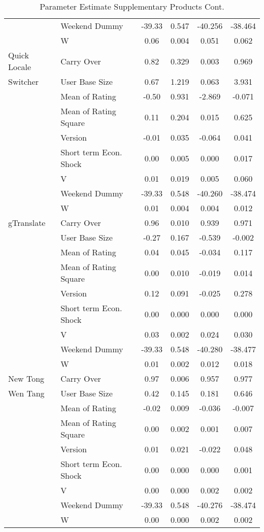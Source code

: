 \documentclass[mksc,nonblindrev]{informs3}
\begin{document}
\begin{table}
\begin{tabular}{llcccc}
	&	Weekend Dummy	&	-39.33	&	0.547	&	-40.256	&	-38.464	\\
	&	W	&	0.06	&	0.004	&	0.051	&	0.062	\\
Quick Locale 	&	Carry Over	&	0.82	&	0.329	&	0.003	&	0.969	\\
Switcher	&	User Base Size	&	0.67	&	1.219	&	0.063	&	3.931	\\
	&	Mean of Rating	&	-0.50	&	0.931	&	-2.869	&	-0.071	\\
	&	Mean of Rating Square	&	0.11	&	0.204	&	0.015	&	0.625	\\
	&	Version	&	-0.01	&	0.035	&	-0.064	&	0.041	\\
	&	Short term Econ. Shock	&	0.00	&	0.005	&	0.000	&	0.017	\\
	&	V	&	0.01	&	0.019	&	0.005	&	0.060	\\
	&	Weekend Dummy	&	-39.33	&	0.548	&	-40.260	&	-38.474	\\
	&	W	&	0.01	&	0.004	&	0.004	&	0.012	\\
gTranslate	&	Carry Over	&	0.96	&	0.010	&	0.939	&	0.971	\\
	&	User Base Size	&	-0.27	&	0.167	&	-0.539	&	-0.002	\\
	&	Mean of Rating	&	0.04	&	0.045	&	-0.034	&	0.117	\\
	&	Mean of Rating Square	&	0.00	&	0.010	&	-0.019	&	0.014	\\
	&	Version	&	0.12	&	0.091	&	-0.025	&	0.278	\\
	&	Short term Econ. Shock	&	0.00	&	0.000	&	0.000	&	0.000	\\
	&	V	&	0.03	&	0.002	&	0.024	&	0.030	\\
	&	Weekend Dummy	&	-39.33	&	0.548	&	-40.280	&	-38.477	\\
	&	W	&	0.01	&	0.002	&	0.012	&	0.018	\\
New Tong	&	Carry Over	&	0.97	&	0.006	&	0.957	&	0.977	\\
 Wen Tang	&	User Base Size	&	0.42	&	0.145	&	0.181	&	0.646	\\
	&	Mean of Rating	&	-0.02	&	0.009	&	-0.036	&	-0.007	\\
	&	Mean of Rating Square	&	0.00	&	0.002	&	0.001	&	0.007	\\
	&	Version	&	0.01	&	0.021	&	-0.022	&	0.048	\\
	&	Short term Econ. Shock	&	0.00	&	0.000	&	0.000	&	0.001	\\
	&	V	&	0.00	&	0.000	&	0.002	&	0.002	\\
	&	Weekend Dummy	&	-39.33	&	0.548	&	-40.276	&	-38.474	\\
	&	W	&	0.00	&	0.000	&	0.002	&	0.002	\\
		\end{tabular}
	\caption{Parameter Estimate Supplementary Products Cont.}
	\label{tab:ParameterEstimateSupplementaryProducts}
\end{table}
\end{document}
